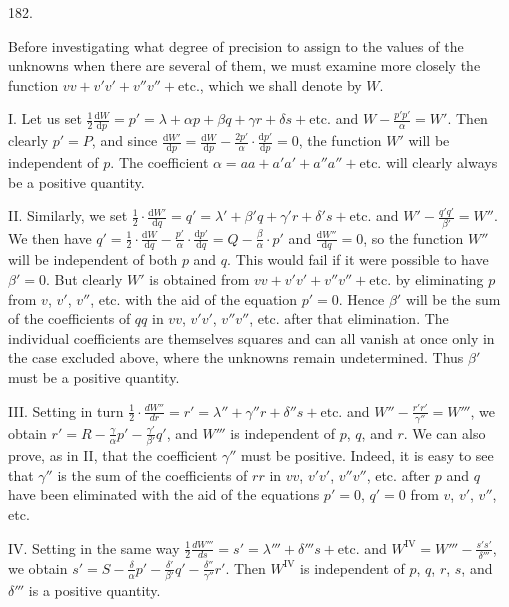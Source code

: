 \begin{center}\hypertarget{native-254-article182}{}182.\end{center}
Before investigating what degree of precision to assign to the values of the unknowns when there are several of them, we must examine more closely the function $vv+v'v'+v''v''+\text{etc.}$, which we shall denote by $W$.

I. Let us set $\tfrac12\frac{\mathrm{d}W}{\mathrm{d}p}=p'
=\lambda+\alpha p+\beta q+\gamma r+\delta s+\text{etc.}$ and $W-\frac{p'p'}{\alpha}=W'$. Then clearly $p'=P$, and since $\frac{\mathrm{d}W'}{\mathrm{d}p}=\frac{\mathrm{d}W}{\mathrm{d}p}
-\frac{2p'}{\alpha}\cdot\frac{\mathrm{d}p'}{\mathrm{d}p}=0$, the function $W'$ will be independent of $p$. The coefficient $\alpha=aa+a'a'+a''a''+\text{etc.}$ will clearly always be a positive quantity.

II. Similarly, we set $\tfrac12\cdot\frac{\mathrm{d}W'}{\mathrm{d}q}=q'
=\lambda'+\beta'q+\gamma'r+\delta's+\text{etc.}$ and $W'-\frac{q'q'}{\beta'}=W''$. We then have $q'=\tfrac12\cdot\frac{\mathrm{d}W}{\mathrm{d}q}
-\frac{p'}{\alpha}\cdot\frac{\mathrm{d}p'}{\mathrm{d}q}
=Q-\frac{\beta}{\alpha}\cdot p'$ and $\frac{\mathrm{d}W''}{\mathrm{d}q}=0$, so the function $W''$ will be independent of both $p$ and $q$. This would fail if it were possible to have $\beta'=0$. But clearly $W'$ is obtained from $vv+v'v'+v''v''+\text{etc.}$ by eliminating $p$ from $v$, $v'$, $v''$, etc. with the aid of the equation $p'=0$. Hence $\beta'$ will be the sum of the coefficients of $qq$ in $vv$, $v'v'$, $v''v''$, etc. after that elimination. The individual coefficients are themselves squares and can all vanish at once only in the case excluded above, where the unknowns remain undetermined. Thus $\beta'$ must be a positive quantity.

III. Setting in turn $\tfrac12\cdot\frac{dW''}{dr}=r'
=\lambda''+\gamma''r+\delta''s+\text{etc.}$ and $W''-\frac{r'r'}{\gamma''}=W'''$, we obtain $r'=R-\frac{\gamma}{\alpha}p'-\frac{\gamma'}{\beta'}q'$, and $W'''$ is independent of $p$, $q$, and $r$. We can also prove, as in II, that the coefficient $\gamma''$ must be positive. Indeed, it is easy to see that $\gamma''$ is the sum of the coefficients of $rr$ in $vv$, $v'v'$, $v''v''$, etc. after $p$ and $q$ have been eliminated with the aid of the equations $p'=0$, $q'=0$ from $v$, $v'$, $v''$, etc.

IV. Setting in the same way $\tfrac12\frac{dW'''}{ds}=s'
=\lambda'''+\delta'''s+\text{etc.}$ and $W^{\mathrm{IV}}=W'''-\frac{s's'}{\delta'''}$, we obtain $s'=S-\frac{\delta}{\alpha}p'-\frac{\delta'}{\beta'}q'-\frac{\delta''}{\gamma''}r'$. Then $W^{\mathrm{IV}}$ is independent of $p$, $q$, $r$, $s$, and $\delta'''$ is a positive quantity.

